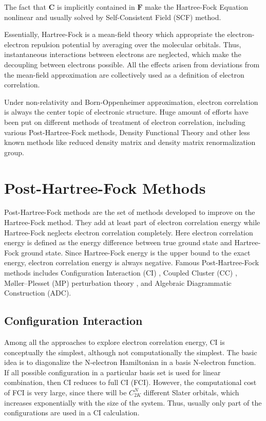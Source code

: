 The fact that $\mathbf{C}$ is implicitly contained in $\mathbf{F}$ make the Hartree-Fock Equation nonlinear and usually solved by Self-Consistent Field (SCF) method.

Essentially, Hartree-Fock is a mean-field theory which appropriate the electron-electron repulsion potential by averaging over the molecular orbitals.
Thus, instantaneous interactions between electrons are neglected, which make the decoupling between electrons possible.
All the effects arisen from deviations from the mean-field approximation are collectively used as a definition of electron correlation.

Under non-relativity and Born-Oppenheimer approximation, electron correlation is always the center topic of electronic structure.
Huge amount of efforts have been put on different methods of treatment of electron correlation,
including various Post-Hartree-Fock methods, Density Functional Theory and other less known methods like reduced density matrix \cite{reduceddm} and density matrix renormalization group. \cite{dmrg}

\section{Post-Hartree-Fock Methods}
Post-Hartree-Fock methods are the set of methods developed to improve on the Hartree-Fock method. They add at least part of electron correlation energy while Hartree-Fock neglects electron correlation completely.
Here electron correlation energy is defined as the energy difference between true ground state and Hartree-Fock ground state. Since Hartree-Fock energy is the upper bound to the exact energy, electron correlation energy is always negative.
Famous Post-Hartree-Fock methods includes Configuration Interaction (CI) \cite{mqc}, Coupled Cluster (CC) \cite{coupledcluster}, M{\o}ller–Plesset (MP) perturbation theory \cite{mp2}, and Algebraic Diagrammatic Construction (ADC).

\subsection{Configuration Interaction}
Among all the approaches to explore electron correlation energy, CI is conceptually the simplest, although not computationally the simplest.
The basic idea is to diagonalize the N-electron Hamiltonian in a basis N-electron function.
If all possible configuration in a particular basis set is used for linear combination, then CI reduces to full CI (FCI).
However, the computational cost of FCI is very large, since there will be $C_{2K}^{N}$ different Slater orbitals, which increases exponentially with the size of the system.
Thus, usually only part of the configurations are used in a CI calculation.

